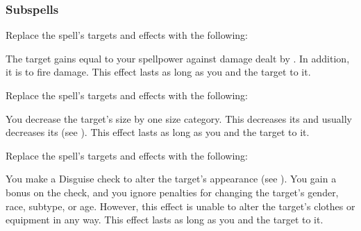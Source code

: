 \subsubsection{Subspells}
Replace the spell's targets and effects with the following:
\begin{spellcontent}
\begin{augmenttargetinginfo}
\end{augmenttargetinginfo}
\begin{augmenteffects}
\spelleffect
The target gains  equal to your spellpower against damage dealt by .
In addition, it is  to fire damage.
This effect lasts as long as you and the target  to it.
\end{augmenteffects}
\end{spellcontent}
Replace the spell's targets and effects with the following:
\begin{spellcontent}
\begin{augmenttargetinginfo}
\end{augmenttargetinginfo}
\begin{augmenteffects}
\spelleffect
You decrease the target's size by one size category.
This decreases its  and usually decreases its  (see ).
This effect lasts as long as you and the target  to it.
\end{augmenteffects}
\end{spellcontent}
Replace the spell's targets and effects with the following:
\begin{spellcontent}
\begin{augmenttargetinginfo}
\end{augmenttargetinginfo}
\begin{augmenteffects}
\spelleffect
You make a Disguise check to alter the target's appearance (see ).
You gain a  bonus on the check, and you ignore penalties for changing the target's gender, race, subtype, or age.
However, this effect is unable to alter the target's clothes or equipment in any way.
This effect lasts as long as you and the target  to it.
\end{augmenteffects}
\end{spellcontent}
